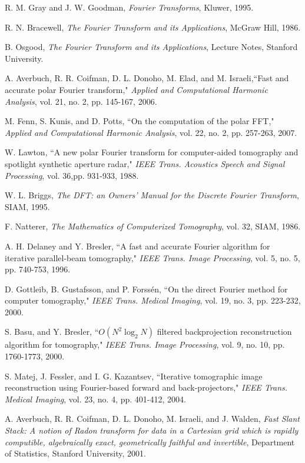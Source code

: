 \documentclass{UCF_ETD}
\begin{document}
\begin{thebibliography}{99}
R. M. Gray and J. W. Goodman, \emph{Fourier Transforms}, Kluwer, 1995.

R. N. Bracewell, \emph{The Fourier Transform and its Applications}, McGraw Hill, 1986.

B. Osgood, \emph{The Fourier Transform and its Applications}, Lecture Notes, Stanford University.

A. Averbuch, R. R. Coifman, D. L. Donoho, M. Elad, and M. Israeli,``Fast and accurate polar Fourier transform,"  \emph{Applied and Computational Harmonic Analysis}, vol. 21, no. 2, pp. 145-167, 2006.

M. Fenn, S. Kunis, and D. Potts, ``On the computation of the polar FFT," \emph{Applied and Computational Harmonic Analysis}, vol. 22, no. 2, pp. 257-263, 2007.

W. Lawton, ``A new polar Fourier transform for computer-aided tomography and spotlight synthetic aperture radar," \emph{IEEE Trans. Acoustics Speech and Signal Processing}, vol. 36,pp. 931-933, 1988.

W. L. Briggs, \emph{The DFT: an Owners' Manual for the Discrete Fourier Transform}, SIAM, 1995.


F. Natterer, \emph{The Mathematics of Computerized Tomography}, vol. 32, SIAM, 1986.

A. H. Delaney and Y. Bresler, ``A fast and accurate Fourier algorithm for iterative parallel-beam tomography," \emph{IEEE Trans. Image Processing}, vol. 5, no. 5, pp. 740-753, 1996.

D. Gottleib, B. Gustafsson, and P. Forss\'en, ``On the direct Fourier method for computer tomography," \emph{ IEEE Trans. Medical Imaging}, vol. 19, no. 3, pp. 223-232, 2000.

S. Basu, and Y. Bresler, ``$O (N^2 \log_2 N)$ filtered backprojection reconstruction algorithm for tomography," \emph{IEEE Trans. Image Processing}, vol. 9, no. 10, pp. 1760-1773, 2000.

S. Matej, J. Fessler, and I. G. Kazantsev, ``Iterative tomographic image reconstruction using Fourier-based forward and back-projectors," \emph{IEEE Trans. Medical Imaging}, vol. 23, no. 4, pp. 401-412, 2004.

A. Averbuch, R. R. Coifman, D. L. Donoho, M. Israeli, and J. Walden, \emph{Fast Slant Stack: A notion of Radon transform for data in a Cartesian grid which is rapidly computible, algebraically exact, geometrically faithful and invertible}, Department of Statistics, Stanford University, 2001.


\end{thebibliography}
\end{document}
